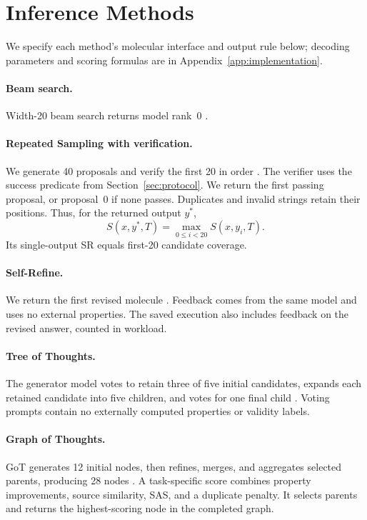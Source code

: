 \section{Inference Methods}
\label{sec:methods}
We specify each method's molecular interface and output rule below; decoding parameters and scoring formulas are in Appendix~\ref{app:implementation}.

\paragraph{Beam search.}
Width-20 beam search returns model rank~0 \citep{beam2014}.

\paragraph{Repeated Sampling with verification.}
We generate 40 proposals and verify the first 20 in order \citep{repeatedsampling2024}. The verifier uses the success predicate from Section~\ref{sec:protocol}. We return the first passing proposal, or proposal~0 if none passes. Duplicates and invalid strings retain their positions. Thus, for the returned output $y^*$,
\begin{equation}
 S(x,y^*,T)=\max_{0\leq i<20}S(x,y_i,T).
 \label{eq:sampling-selection}
\end{equation}
Its single-output SR equals first-20 candidate coverage.

\paragraph{Self-Refine.}
We return the first revised molecule \citep{selfrefine2023}. Feedback comes from the same model and uses no external properties. The saved execution also includes feedback on the revised answer, counted in workload.

\paragraph{Tree of Thoughts.}
The generator model votes to retain three of five initial candidates, expands each retained candidate into five children, and votes for one final child \citep{tot2023}. Voting prompts contain no externally computed properties or validity labels.

\paragraph{Graph of Thoughts.}
GoT generates 12 initial nodes, then refines, merges, and aggregates selected parents, producing 28 nodes \citep{got2024}. A task-specific score combines property improvements, source similarity, SAS, and a duplicate penalty. It selects parents and returns the highest-scoring node in the completed graph.

